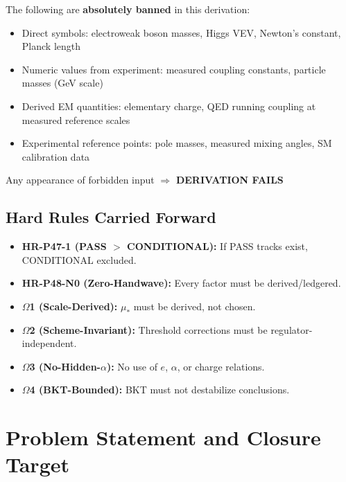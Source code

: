 \documentclass[11pt,a4paper]{article}
\begin{document}
\begin{tcolorbox}[colback=red!5!white,colframe=red!60!black,title=\textbf{FORBIDDEN INPUTS (STRICT BAN)}]
The following are \textbf{absolutely banned} in this derivation:
\begin{itemize}[nosep]
\item Direct symbols: electroweak boson masses, Higgs VEV, Newton's constant, Planck length
\item Numeric values from experiment: measured coupling constants, particle masses (GeV scale)
\item Derived EM quantities: elementary charge, QED running coupling at measured reference scales
\item Experimental reference points: pole masses, measured mixing angles, SM calibration data
\end{itemize}
Any appearance of forbidden input $\Rightarrow$ \textbf{DERIVATION FAILS}
\end{tcolorbox}

\subsection{Hard Rules Carried Forward}
\label{subsec:hard-rules}

\begin{itemize}
\item \textbf{HR-P47-1 (PASS $>$ CONDITIONAL):} If PASS tracks exist, CONDITIONAL excluded.
\item \textbf{HR-P48-N0 (Zero-Handwave):} Every factor must be derived/ledgered.
\item \textbf{$\Omega$1 (Scale-Derived):} $\mu_*$ must be derived, not chosen.
\item \textbf{$\Omega$2 (Scheme-Invariant):} Threshold corrections must be regulator-independent.
\item \textbf{$\Omega$3 (No-Hidden-$\alpha$):} No use of $e$, $\alpha$, or charge relations.
\item \textbf{$\Omega$4 (BKT-Bounded):} BKT must not destabilize conclusions.
\end{itemize}



\section{Problem Statement and Closure Target}
\label{sec:problem}
\end{document}

